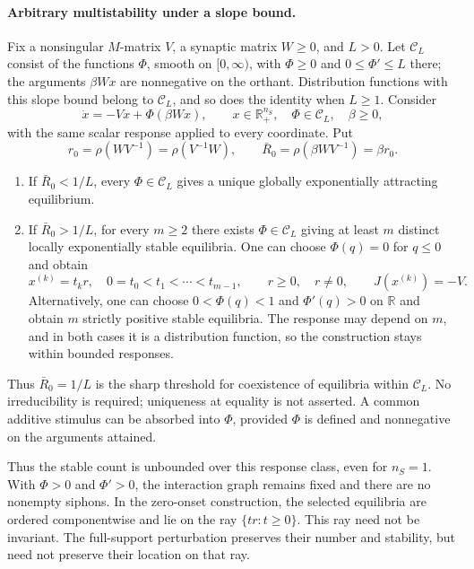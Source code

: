 \paragraph{Arbitrary multistability under a slope bound.}
\label{p:KBinterpolate}\label{o:KBsharp}\label{p:KBmaxstable}\label{o:KBmaxstable}
Fix a nonsingular $M$-matrix $V$, a synaptic matrix $W\ge0$, and $L>0$.
Let $\mathcal C_L$ consist of the functions $\Phi$, smooth on $[0,\infty)$, with $\Phi\ge0$ and
$0\le \Phi'\le L$ there; the arguments $\beta Wx$ are nonnegative on the orthant. Distribution functions
with this slope bound belong to $\mathcal C_L$, and so does the identity when $L\ge1$.
Consider
\begin{equation}\label{eq:KB-sharp-family}
 \dot x=-Vx+\Phi(\beta Wx),\qquad x\in\mathbb R_+^{n_S},
 \quad \Phi\in\mathcal C_L,\quad\beta\ge0,
\end{equation}
with the same scalar response applied to every coordinate. Put
\[
 r_0=\rho(WV^{-1})=\rho(V^{-1}W),\qquad
 \bar R_0=\rho(\beta WV^{-1})=\beta r_0.
\]

\begin{enumerate}
\item If $\bar R_0<1/L$, every $\Phi\in\mathcal C_L$ gives a unique
globally exponentially attracting equilibrium.
\item If $\bar R_0>1/L$, for every $m\ge2$ there exists
$\Phi\in\mathcal C_L$ giving at least $m$ distinct locally exponentially
stable equilibria. One can choose $\Phi(q)=0$ for $q\le0$ and obtain
\[
 x^{(k)}=t_kr,\quad 0=t_0<t_1<\cdots<t_{m-1},
 \qquad r\ge0,\quad r\ne0,\qquad J(x^{(k)})=-V.
\]
Alternatively, one can choose $0<\Phi(q)<1$ and $\Phi'(q)>0$ on
$\mathbb R$ and obtain $m$ strictly positive stable equilibria.
The response may depend on $m$, and in both cases it is a distribution function, so
the construction stays within bounded responses.
\end{enumerate}
Thus $\bar R_0=1/L$ is the sharp threshold for coexistence of equilibria within $\mathcal C_L$.
No irreducibility is required; uniqueness at equality is not asserted.
A common additive stimulus can be absorbed into $\Phi$, provided $\Phi$ is defined and nonnegative on the
arguments attained.

Thus the stable count is unbounded over this response class, even
for $n_S=1$. With $\Phi>0$ and $\Phi'>0$, the interaction graph remains
fixed and there are no nonempty siphons. In the zero-onset construction, the selected equilibria are ordered
componentwise and lie on the ray $\{tr:t\ge0\}$.
This ray need not be invariant. The full-support perturbation
preserves their number and stability, but need not preserve
their location on that ray.
\eeT

